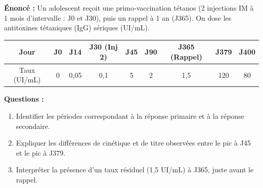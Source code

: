 \documentclass[11pt]{article}
\begin{document}
\begin{exoresolu}
\textbf{Énoncé :} Un adolescent reçoit une primo-vaccination tétanos (2 injections IM à 1 mois d'intervalle : J0 et J30), puis un rappel à 1 an (J365). On dose les antitoxines tétaniques (IgG) sériques (UI/mL).
\begin{center}
\begin{tabular}{|c|c|c|c|c|c|c|c|c|}\hline
Jour & J0 & J14 & J30 (Inj 2) & J45 & J90 & J365 (Rappel) & J379 & J400 \\ \hline
Taux (UI/mL) & 0 & 0,05 & 0,1 & 5 & 2 & 1,5 & 120 & 80 \\ \hline
\end{tabular}
\end{center}
\textbf{Questions :}
\begin{enumerate}
    \item Identifier les périodes correspondant à la réponse primaire et à la réponse secondaire.
    \item Expliquer les différences de cinétique et de titre observées entre le pic à J45 et le pic à J379.
    \item Interpréter la présence d'un taux résiduel (1,5 UI/mL) à J365, juste avant le rappel.
\end{enumerate}


\end{exoresolu}
\end{document}
